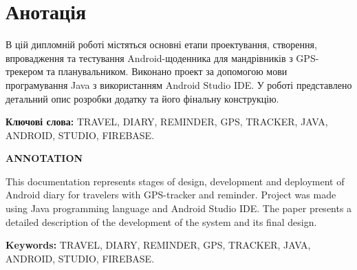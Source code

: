 \chapter*{Анотація}


В цій дипломній роботі містяться основні етапи проектування, створення, впровадження та тестування Android-щоденника для мандрівників з GPS-трекером та планувальником. Виконано проект за допомогою мови програмування Java з використанням Android Studio IDE. У роботі представлено детальний опис розробки додатку та його фінальну конструкцію.

\textbf{Ключові слова:} TRAVEL, DIARY, REMINDER, GPS, TRACKER, JAVA, ANDROID, STUDIO, FIREBASE.

\hfill

\begin{center}
	\textbf{\MakeUppercase{Annotation}}
\end{center}

This documentation represents stages of design, development and deployment of Android diary for travelers with GPS-tracker and reminder. Project was made using Java programming language and Android Studio IDE. The paper presents a detailed description of the development of the system and its final design.

\textbf{Keywords:} TRAVEL, DIARY, REMINDER, GPS, TRACKER, JAVA, ANDROID, STUDIO, FIREBASE.
